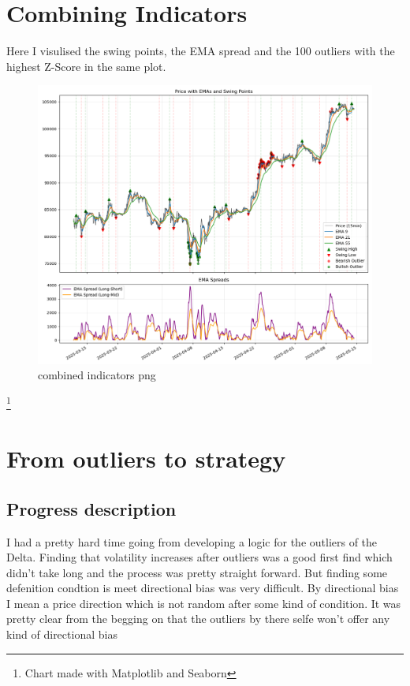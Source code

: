 \documentclass[12pt]{article}
\begin{document}
\newpage
\section{Combining Indicators}
Here I visulised the swing points, the EMA spread and the 100 outliers with the highest Z-Score in the same plot.

\begin{figure}[H]
    \centering
    \includegraphics[width=\textwidth]{imgs/swingpoints_emaspread_priceOutliers.png}
    \caption{combined indicators png}
\end{figure}

\footnote{Chart made with Matplotlib and Seaborn}






\newpage
\section{From outliers to strategy}
\subsection{Progress description}
I had a pretty hard time going from developing a logic for the outliers of the Delta. Finding that volatility increases after outliers was a good first find which didn't take long and the process was pretty straight forward. But finding some defenition condtion is meet directional bias was very difficult. By directional bias I mean a price direction which is not random after some kind of condition. It was pretty clear from the begging on that the outliers by there selfe won't offer any kind of directional bias
\end{document}

